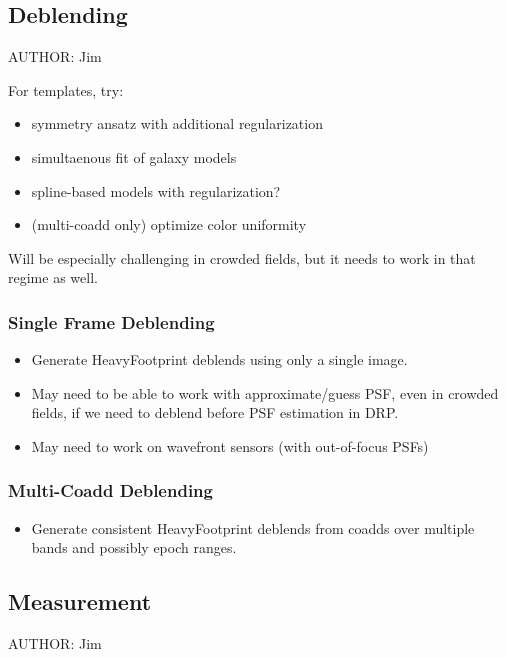 \subsection{Deblending}
\label{sec:acDeblending}
AUTHOR: Jim

For templates, try:
\begin{itemize}
\item symmetry ansatz with additional regularization
\item simultaenous fit of galaxy models
\item spline-based models with regularization?
\item (multi-coadd only) optimize color uniformity
\end{itemize}

Will be especially challenging in crowded fields, but it needs to work in that regime as well.

\subsubsection{Single Frame Deblending}
\label{sec:acSingleFrameDeblending}
\begin{itemize}
\item Generate HeavyFootprint deblends using only a single image.
\item May need to be able to work with approximate/guess PSF, even in crowded fields, if we need to deblend before PSF estimation in DRP.
\item May need to work on wavefront sensors (with out-of-focus PSFs)
\end{itemize}

\subsubsection{Multi-Coadd Deblending}
\label{sec:acMultiCoaddDeblending}
\begin{itemize}
\item Generate consistent HeavyFootprint deblends from coadds over multiple bands and possibly epoch ranges.
\end{itemize}

\subsection{Measurement}
\label{sec:acMeasurement}
AUTHOR: Jim

